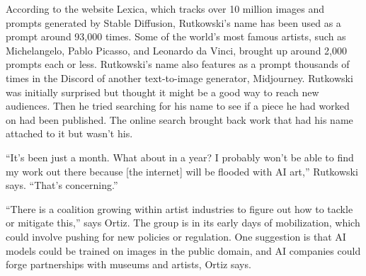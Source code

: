 \documentclass[12pt,a4paper]{article}
\begin{document}
\begin{reading}
\begin{examtext}
According to the website Lexica, which tracks over 10 million images and prompts generated by Stable Diffusion, Rutkowski's name has been used as a prompt around 93,000 times. Some of the world's most famous artists, such as Michelangelo, Pablo Picasso, and Leonardo da Vinci, brought up around 2,000 prompts each or less. Rutkowski's name also features as a prompt thousands of times in the Discord of another text-to-image generator, Midjourney. Rutkowski was initially surprised but thought it might be a good way to reach new audiences. Then he tried searching for his name to see if a piece he had worked on had been published. The online search brought back work that had his name attached to it but wasn't his.

``It's been just a month. What about in a year? I probably won't be able to find my work out there because [the internet] will be flooded with AI art,'' Rutkowski says. ``That's concerning.''

``There is a coalition growing within artist industries to figure out how to tackle or mitigate this,'' says Ortiz. The group is in its early days of mobilization, which could involve pushing for new policies or regulation. One suggestion is that AI models could be trained on images in the public domain, and AI companies could forge partnerships with museums and artists, Ortiz says.
\end{examtext}






\end{reading}
\end{document}
